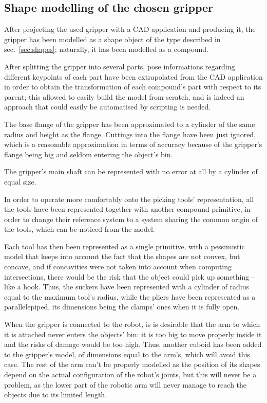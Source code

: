 \subsection{Shape modelling of the chosen gripper}
After projecting the used gripper with a CAD application and producing it, the
gripper has been modelled as a shape object of the type described in sec.~\ref{sec:shapes}; naturally, it has been modelled as a compound.

After splitting the gripper into several parts, pose informations regarding
different keypoints of each part have been
extrapolated from the CAD application in order to obtain the transformation of
each compound's part with respect to its parent; this allowed to easily build
the model from scratch, and is indeed an approach that could easily be automatised by
scripting is needed.

The base flange of the gripper has been approximated to a cylinder of the same
radius and height as the flange. Cuttings into the flange have been just
ignored, which is a reasonable approximation in terms of accuracy because 
of the gripper's flange being big and seldom entering the object's bin.

The gripper's main shaft can be represented with no error at all by a cylinder
of equal size.

In order to operate more comfortably onto the picking tools' representation,
all the tools have been represented together with another compound primitive,
in order to change their reference system to a system sharing the common origin
of the tools, which can be noticed from the model.

Each tool has then been represented as a single primitive, with a pessimistic
model that  
keeps into account the fact that the shapes are not convex, but concave, and if
concavities were not taken into account when computing intersections, there
would be the risk that the object could pick up something -- like a hook. Thus,
the suckers have been represented with a cylinder of radius equal to the maximum
tool's radius, while the pliers have been represented as a parallelepiped, its
dimensions being the clamps' ones when it is fully open.

When the gripper is connected to the robot, is is desirable that the arm to
which it is attached never enters the objects' bin: it is too big to move
properly inside it and the risks of damage would be too high. Thus, another
cuboid has been added to the gripper's model, of dimensions equal to the arm's,
which will avoid this case. The rest of the arm can't be properly modelled as
the position of its shapes depend on the actual configuration of the robot's
joints, but this will never be a problem, as the lower part of the robotic arm
will never manage to reach the objects due to its limited length.

